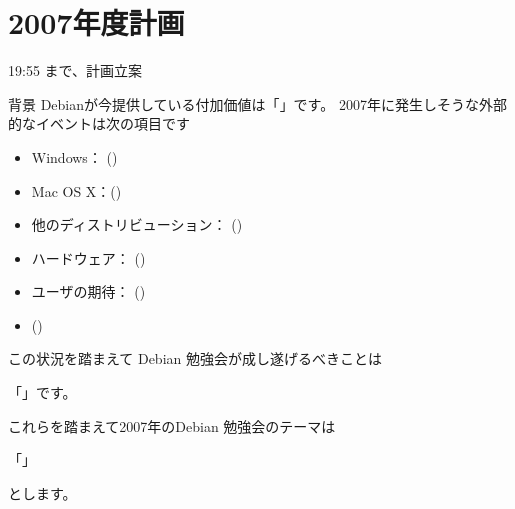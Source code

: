\documentclass[cjk,dvipdfmx]{beamer}
\begin{document}
\section{2007年度計画}

\begin{frame}

 19:55 まで、計画立案

\end{frame}

\begin{frame}{背景}
\tiny
Debianが今提供している付加価値は「\underline{\hspace{8cm}}」です。
2007年に発生しそうな外部的なイベントは次の項目です
\begin{itemize}
 \item Windows： (\underline{\hspace{8cm}})
 \item Mac OS X：(\underline{\hspace{8cm}})
 \item 他のディストリビューション： (\underline{\hspace{8cm}})
 \item ハードウェア： (\underline{\hspace{8cm}})
 \item ユーザの期待： (\underline{\hspace{8cm}})
 \item (\underline{\hspace{8cm}})
\end{itemize}

この状況を踏まえて Debian 勉強会が成し遂げるべきことは

「\underline{\hspace{8cm}}」です。

これらを踏まえて2007年のDebian 勉強会のテーマは

「\underline{\hspace{8cm}}」

とします。
\end{frame}
\end{document}
